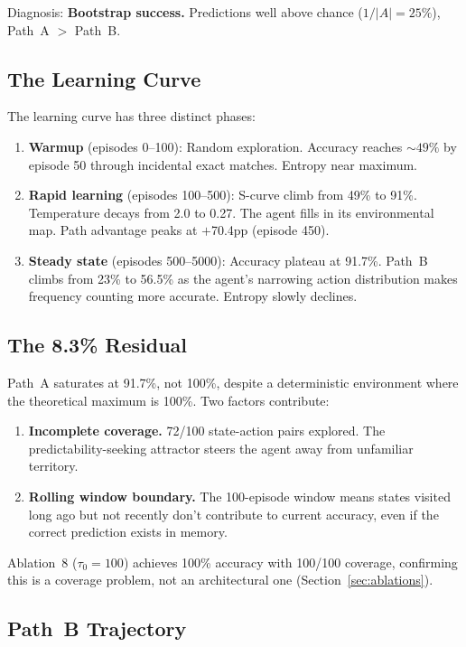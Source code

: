 \documentclass[11pt,a4paper]{article}
\begin{document}
Diagnosis: \textbf{Bootstrap success.} Predictions well above chance ($1/|A| = 25\%$), Path~A $>$ Path~B.

\subsection{The Learning Curve}

The learning curve has three distinct phases:

\begin{enumerate}[nosep]
    \item \textbf{Warmup} (episodes 0--100): Random exploration. Accuracy reaches ${\sim}49\%$ by episode 50 through incidental exact matches. Entropy near maximum.
    \item \textbf{Rapid learning} (episodes 100--500): S-curve climb from 49\% to 91\%. Temperature decays from 2.0 to 0.27. The agent fills in its environmental map. Path advantage peaks at $+$70.4pp (episode 450).
    \item \textbf{Steady state} (episodes 500--5000): Accuracy plateau at 91.7\%. Path~B climbs from 23\% to 56.5\% as the agent's narrowing action distribution makes frequency counting more accurate. Entropy slowly declines.
\end{enumerate}

\subsection{The 8.3\% Residual}

Path~A saturates at 91.7\%, not 100\%, despite a deterministic environment where the theoretical maximum is 100\%. Two factors contribute:

\begin{enumerate}[nosep]
    \item \textbf{Incomplete coverage.} 72/100 state-action pairs explored. The predictability-seeking attractor steers the agent away from unfamiliar territory.
    \item \textbf{Rolling window boundary.} The 100-episode window means states visited long ago but not recently don't contribute to current accuracy, even if the correct prediction exists in memory.
\end{enumerate}

Ablation~8 ($\tau_0 = 100$) achieves 100\% accuracy with 100/100 coverage, confirming this is a coverage problem, not an architectural one (Section~\ref{sec:ablations}).

\subsection{Path~B Trajectory}
\end{document}
